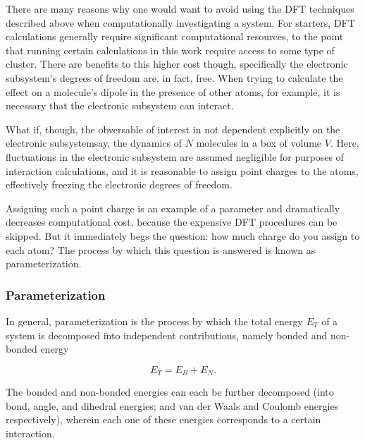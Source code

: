     There are many reasons why one would want to avoid using the DFT techniques described above when computationally investigating a system. For starters, DFT calculations generally require significant computational resources, to the point that running certain calculations in this work require access to some type of cluster. There are benefits to this higher cost though, specifically the electronic subsystem's degrees of freedom are, in fact, free. When trying to calculate the effect on a molecule's dipole in the presence of other atoms, for example, it is necessary that the electronic subsystem can interact.
    
    What if, though, the obversable of interest in not dependent explicitly on the electronic subsystem\textemdash say, the dynamics of $N$ molecules in a box of volume $V$. Here, fluctuations in the electronic subsystem are assumed negligible for purposes of interaction calculations, and it is reasonable to assign point charges to the atoms, effectively freezing the electronic degrees of freedom. 
    
    Assigning such a point charge is an example of a parameter and dramatically decreases computational cost, because the expensive DFT procedures can be skipped. But it immediately begs the question: how much charge do you assign to each atom? The process by which this question is answered is known as parameterization.
    
        \subsubsection{Parameterization}
        
        In general, parameterization is the process by which the total energy $E_T$ of a system is decomposed into independent contributions, namely bonded and non-bonded energy
        
        \begin{equation}
            E_T = E_B + E_N.
        \end{equation}
        
        \noindent The bonded and non-bonded energies can each be further decomposed (into bond, angle, and dihedral energies; and van der Waals and Coulomb energies respectively), wherein each one of these energies corresponds to a certain interaction.
        
